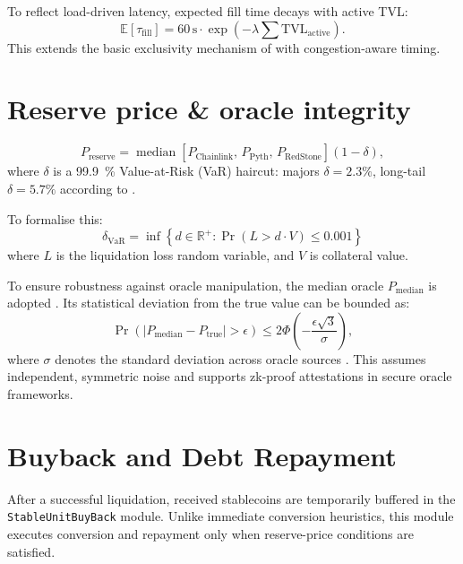 \documentclass[11pt]{article}
\begin{document}
To reflect load-driven latency, expected fill time decays with active TVL:
\[
\mathbb{E}[\tau_{\text{fill}}] = 60\,\text{s} \cdot \exp\left(-\lambda \sum \text{TVL}_{\text{active}}\right).
\]
This extends the basic exclusivity mechanism of \textcite{stableunit2025spec} with congestion-aware timing.


\section{Reserve price \& oracle integrity}
\label{sec:reserve}
\[
P_{\text{reserve}} =
\operatorname*{median}\left[
P_{\text{Chainlink}},\,
P_{\text{Pyth}},\,
P_{\text{RedStone}}
\right] (1 - \delta),
\]
where $\delta$ is a \SI{99.9}{\percent} Value-at-Risk (VaR) haircut: majors $\delta = 2.3\%$, long-tail $\delta = 5.7\%$ according to \parencite[Fig.~10]{tian2025defi}.

To formalise this:
\[
\delta_{\text{VaR}} = \inf\left\{ d \in \mathbb{R}^+ : \Pr\left(L > d \cdot V\right) \leq 0.001 \right\}
\]
where \( L \) is the liquidation loss random variable, and \( V \) is collateral value.

\medskip

To ensure robustness against oracle manipulation, the median oracle \( P_{\text{median}} \) is adopted \parencite{eskandari2021sok}. Its statistical deviation from the true value can be bounded as:
\[
\Pr\left(\left| P_{\text{median}} - P_{\text{true}} \right| > \epsilon\right) \leq 2\Phi\left(-\frac{\epsilon\sqrt{3}}{\sigma}\right),
\]
where \( \sigma \) denotes the standard deviation across oracle sources \parencite{deng2024safeguarding}. This assumes independent, symmetric noise and supports zk-proof attestations in secure oracle frameworks.




\section{Buyback and Debt Repayment}
\label{sec:buyback}
After a successful liquidation, received stablecoins are temporarily buffered in the \texttt{StableUnitBuyBack} module.  
Unlike immediate conversion heuristics, this module executes conversion and repayment only when reserve-price conditions are satisfied.
\end{document}
